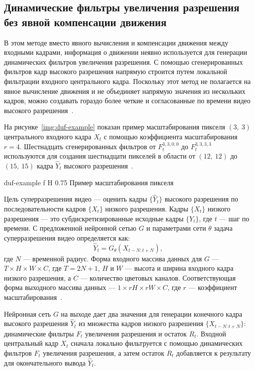 \documentclass{bmstu}
\begin{document}
\subsection{Динамические фильтры увеличения разрешения без явной компенсации движения}

В этом методе вместо явного вычисления и компенсации движения между входными кадрами, информация о движении неявно используется для генерации динамических фильтров увеличения разрешения. 
С помощью сгенерированных фильтров кадр высокого разрешения напрямую строится путем локальной фильтрации входного центрального кадра. 
Поскольку этот метод не полагается на явное вычисление движения и не объединяет напрямую значения из нескольких кадров, можно создавать гораздо более четкие и согласованные по времени видео высокого разрешения~\cite{Younghyun2018}.

На рисунке~\ref{img:duf-example} показан пример масштабирования пикселя $(3,~3)$ центрального входного кадра $X_t$ с помощью коэффициента масштабирования $r = 4$. 
Шестнадцать сгенерированных фильтров от $F^{3,3,0,0}_t$ до $F^{3,3,3,3}_t$ используются для создания шестнадцати пикселей в области от $(12,~12)$ до $(15,~15)$ кадра $\hat{Y}_t$ высокого разрешения~\cite{Younghyun2018}.

    {duf-example}
    {f}
    {H}
    {0.75\textwidth}
    {Пример масштабирования пикселя~\cite{Younghyun2018}}
    
Цель суперразрешения видео --- оценить кадры $\{\hat{Y}_t\}$ высокого разрешения по последовательности кадров $\{X_t\}$ низкого разрешения. 
Кадры $\{X_t\}$ низкого разрешения --- это субдискретизированные исходные кадры $\{Y_t\}$, где $t$ --- шаг по времени. 
С предложенной нейронной сетью $G$ и параметрами сети $\theta$ задача суперразрешения видео определяется как:
\begin{equation}
\hat{Y}_t = G_\theta(X_{t - N:t + N}),
\end{equation}
где $N$ --- временной радиус. 
Форма входного массива данных для $G$ --- $T \times H \times W \times C$, где $T = 2N + 1$, $H$ и $W$ --- высота и ширина входного кадра низкого разрешения, а $C$ --- количество цветовых каналов. 
Соответствующая форма выходного массива данных --- $1 \times rH \times rW \times C$, где $r$ --- коэффициент масштабирования~\cite{Younghyun2018}.

Нейронная сеть $G$ на выходе дает два значения для генерации конечного кадра высокого разрешения $\hat{Y}_t$ из множества кадров низкого разрешения $\{X_{t - N:t + N}\}$: динамические фильтры $F_t$ увеличения разрешения и остаток $R_t$. 
Входной центральный кадр $X_t$ сначала локально фильтруется с помощью динамических фильтров $F_t$ увеличения разрешения, а затем остаток $R_t$ добавляется к результату для окончательного вывода $\hat{Y}_t$.
\end{document}
